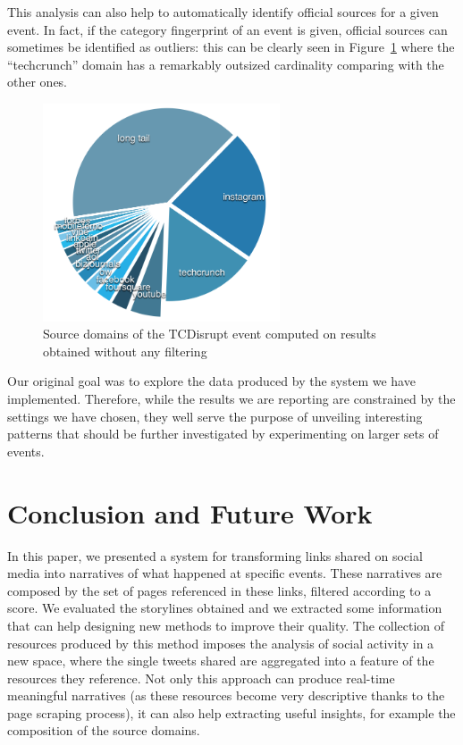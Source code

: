 \documentclass{sig-alternate-somus}
\begin{document}
This analysis can also help to automatically identify official sources for a given event. In fact, if the category fingerprint of an event is given, official sources can sometimes be identified as outliers: this can be clearly seen in Figure~\ref{fig:tcdisrupt_outlier} where the ``techcrunch'' domain has a remarkably outsized cardinality comparing with the other ones.
\begin{figure}[htbp]
  \centering
  \includegraphics[width=7cm]{Figures/tcdisrupt_outlier.png}
  \caption{Source domains of the TCDisrupt event computed on results obtained without any filtering}
  \label{fig:tcdisrupt_outlier}
\end{figure}

Our original goal was to explore the data produced by the system we have implemented. Therefore, while the results we are reporting are constrained by the settings we have chosen, they well serve the purpose of unveiling interesting patterns that should be further investigated by experimenting on larger sets of events.


\section{Conclusion and Future Work}
\label{sec:conclusions}
In this paper, we presented a system for transforming links shared on social media into narratives of what happened at specific events. These narratives are composed by the set of pages referenced in these links, filtered according to a score. We evaluated the storylines obtained and we extracted some information that can help designing new methods to improve their quality. The collection of resources produced by this method imposes the analysis of social activity in a new space, where the single tweets shared are aggregated into a feature of the resources they reference. Not only this approach can produce real-time meaningful narratives (as these resources become very descriptive thanks to the page scraping process), it can also help extracting useful insights, for example the composition of the source domains.
\end{document}
